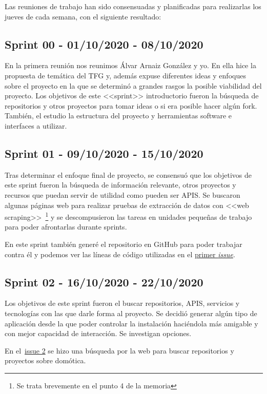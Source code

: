 Las reuniones de trabajo han sido consensuadas y planificadas para realizarlas los jueves de cada semana, con el siguiente resultado:

\subsection{Sprint 00 - 01/10/2020 - 08/10/2020}
En la primera reunión nos reunimos Álvar Arnaiz González y yo. En ella hice la propuesta de temática del TFG y, además expuse diferentes ideas y enfoques sobre el proyecto en la que se determinó a grandes rasgos la posible viabilidad del proyecto.
Los objetivos de este <<sprint>> introductorio fueron la búsqueda de repositorios y otros proyectos para tomar ideas o si era posible hacer algún fork. También, el estudio la estructura del proyecto y herramientas software e interfaces a utilizar.

\subsection{Sprint 01 - 09/10/2020 - 15/10/2020}
Tras determinar el enfoque final de proyecto, se consensuó que los objetivos de este sprint fueron la búsqueda de información relevante, otros proyectos y recursos que puedan servir de utilidad como pueden ser APIS. Se buscaron algunas páginas web para realizar pruebas de extracción de datos con <<web scraping>>~\footnote{Se trata brevemente en el punto 4 de la memoria} y se descompusieron las tareas en unidades pequeñas de trabajo para poder afrontarlas durante sprints.

En este sprint también generé el repositorio en GitHub para poder trabajar contra él y podemos ver las líneas de código utilizadas en el \href{https://github.com/davidelinformatico/TFG/issues/1}{primer \textit{issue}}.

\subsection{Sprint 02 - 16/10/2020 - 22/10/2020}
Los objetivos de este sprint fueron el buscar repositorios, APIS, servicios y tecnologías con las que darle forma al proyecto. Se decidió generar algún tipo de aplicación desde la que poder controlar la instalación haciéndola más amigable y con mejor capacidad de interacción. Se investigan opciones.

En el~\href{https://github.com/davidelinformatico/TFG/issues/2}{issue 2} se hizo una búsqueda por la web para buscar repositorios y proyectos sobre domótica.

